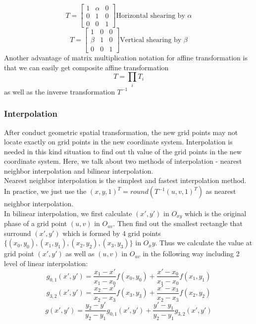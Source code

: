 \begin{equation} T= \begin{bmatrix} 1&\alpha&0 \\ 0&1&0 \\ 0&0&1 \end{bmatrix} \text{Horizontal shearing by }\alpha \end{equation}
\begin{equation} T= \begin{bmatrix} 1&0&0 \\ \beta&1&0 \\ 0&0&1 \end{bmatrix} \text{Vertical shearing by }\beta \end{equation}
Another advantage of matrix multiplication notation for affine transformation is that we can easily get composite affine transformation \begin{equation} T=\prod_i T_i \end{equation} as well as the inverse transformation $T^{-1}$
\subsubsection{Interpolation}
After conduct geometric spatial transformation, the new grid points may not locate exactly on grid points in the new coordinate system. Interpolation is needed in this kind situation to find out th value of the grid points in the new coordinate system. Here, we talk about two methods of interpolation - nearest neighbor interpolation and bilinear interpolation.\\ 
Nearest neighbor interpolation is the simplest and fastest interpolation method. In practice, we just use the $(x,y,1)^T = round(T^{-1}(u,v,1)^T)$ as nearest neighbor interpolation.\\
In bilinear interpolation, we first calculate $(x',y')$ in $O_{xy}$ which is the original phase of a grid point $(u,v)$ in $O_{uv}$. Then find out the smallest rectangle that surround $(x', y')$ which is formed by 4 grid points $\{(x_0,y_0), (x_1,y_1), (x_2,y_2), (x_3,y_3)\}$ in $O_xy$. Thus we calculate the value at grid point $(x', y')$ as well as $(u,v)$ in $O_{uv}$ in the following way including 2 level of linear interpolation: \begin{equation} g_{0,1}(x',y')=\frac{x_1-x'}{x_1-x_0}f(x_0, y_0) + \frac{x'-x_0}{x_1-x_0}f(x_1, y_1)\end{equation} \begin{equation} g_{3,2}(x',y')=\frac{x_2-x'}{x_2-x_3}f(x_3, y_3) + \frac{x'-x_3}{x_2-x_3}f(x_2, y_2)  \end{equation} \begin{equation} g(x',y')=\frac{y_2-y'}{y_2-y_1}g_{0,1}(x',y') + \frac{y'-y_1}{y_2-y_1}g_{3,2}(x',y')  \end{equation}

